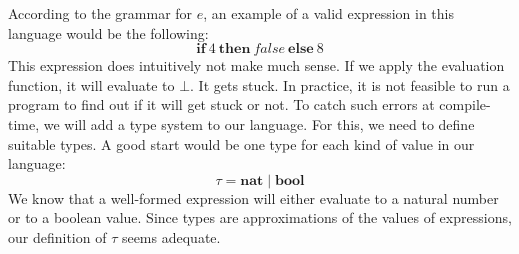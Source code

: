 \documentclass[10pt,a4paper]{exam}
\begin{document}
\begin{questions}
According to the grammar for $e$, an example of a valid expression in this language would be the following:
\begin{displaymath}
\mathbf{if}~4~\mathbf{then}~\mathit{false}~\mathbf{else}~8
\end{displaymath}
This expression does intuitively not make much sense. If we apply the evaluation function, it will evaluate to $\bot$. It gets stuck. In practice, it is not feasible to run a program to find out if it will get stuck or not. To catch such errors at compile-time, we will add a type system to our language. For this, we need to define suitable types. A good start would be one type for each kind of value in our language: 
\begin{displaymath}
\tau = \mathbf{nat} \mid \mathbf{bool}
\end{displaymath}
We know that a well-formed expression will either evaluate to a natural number or to a boolean value. Since types are approximations of the values of expressions, our definition of $\tau$ seems adequate.




\end{questions}
\end{document}
